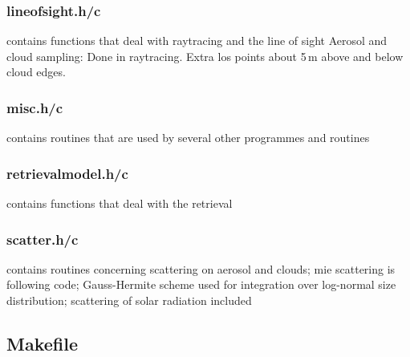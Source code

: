 \subsubsection{lineofsight.h/c}
\label{sec:lineofsight}
contains functions that deal with raytracing and the line of sight
Aerosol and cloud sampling: Done in raytracing. Extra los points about 5\,m above and below cloud edges.

\subsubsection{misc.h/c}
contains routines that are used by several other programmes and routines

\subsubsection{retrievalmodel.h/c}
contains functions that deal with the retrieval

\subsubsection{scatter.h/c}
contains routines concerning scattering on aerosol and clouds; mie scattering is following \citet{Bohren1983} code; Gauss-Hermite scheme used for integration over log-normal size distribution; scattering of solar radiation included

\subsection{Makefile}